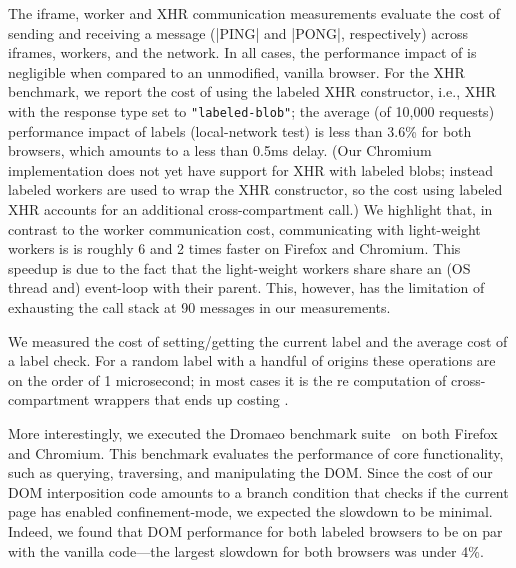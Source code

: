 %
The iframe, worker and XHR communication measurements evaluate the
cost of sending and receiving a message (\js|PING| and \js|PONG|,
respectively) across iframes, workers, and the network.
%
In all cases, the performance impact of \sys{} is negligible when
compared to an unmodified, vanilla browser.
%
For the XHR benchmark, we report the cost of using the labeled XHR
constructor, i.e., XHR with the response type set to
\verb|"labeled-blob"|; the average (of 10,000 requests) performance
impact of labels (local-network test) is less than 3.6\% for both
browsers, which amounts to a less than 0.5ms delay.
%
(Our Chromium implementation does not yet have support for XHR with
labeled blobs; instead labeled workers are used to wrap the XHR
constructor, so the cost using labeled XHR accounts for an additional
cross-compartment call.)
%
We highlight that, in contrast to the worker communication cost,
communicating with light-weight workers is is roughly 6 and 2 times
faster on Firefox and Chromium.
%
This speedup is due to the fact that the light-weight workers share
share an (OS thread and) event-loop with their parent.
%
This, however, has the limitation of exhausting the call stack at 90
messages in our measurements.


We measured the cost of setting/getting the current label and the
average cost of a label check.
%
For a random label with a handful of origins these operations are on
the order of 1 microsecond; in most cases it is the re computation of
cross-compartment wrappers that ends up costing .
 
More interestingly,  we executed the Dromaeo benchmark
suite~\cite{dromaeo} on both Firefox and Chromium.
%
This benchmark evaluates the performance of core functionality,
such as querying, traversing, and manipulating the DOM.
%
Since the cost of our DOM interposition code amounts to a branch
condition that checks if the current page has enabled
confinement-mode, we expected the slowdown to be minimal. Indeed, we
found that DOM performance for both labeled browsers to be on par with
the vanilla code---the largest slowdown for both browsers was under
4\%.





